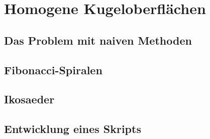 \section{Homogene Kugeloberflächen}
\subsection{Das Problem mit naiven Methoden}
\subsection{Fibonacci-Spiralen}
\subsection{Ikosaeder}
\subsection{Entwicklung eines Skripts}
